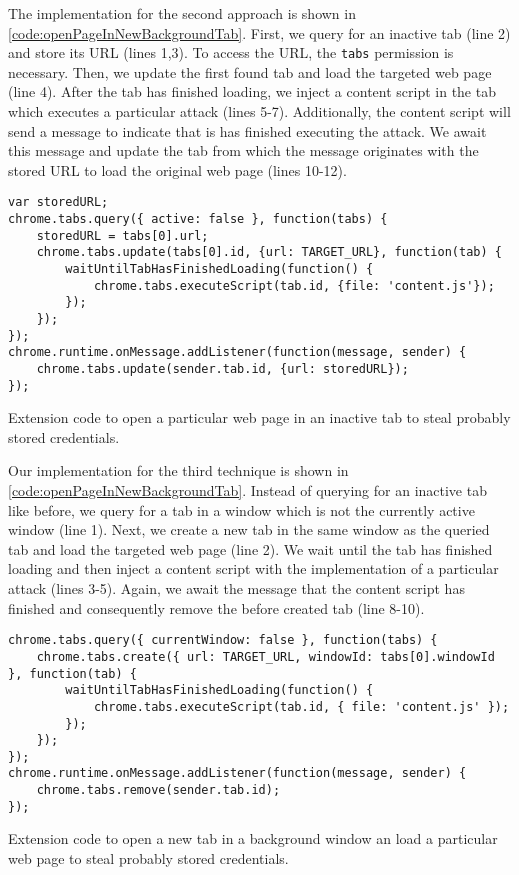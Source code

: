 	The implementation for the second approach is shown in \autoref{code:openPageInNewBackgroundTab}. First, we query for an inactive tab (line 2) and store its URL (lines 1,3). To access the URL, the \texttt{tabs} permission is necessary. Then, we update the first found tab and load the targeted web page (line 4). After the tab has finished loading, we inject a content script in the tab which executes a particular attack (lines 5-7). Additionally, the content script will send a message to indicate that is has finished executing the attack. We await this message and update the tab from which the message originates with the stored URL to load the original web page (lines 10-12).
		
	\begin{code}
		\begin{lstlisting}
var storedURL;
chrome.tabs.query({ active: false }, function(tabs) {	
	storedURL = tabs[0].url;
	chrome.tabs.update(tabs[0].id, {url: TARGET_URL}, function(tab) {
		waitUntilTabHasFinishedLoading(function() {
			chrome.tabs.executeScript(tab.id, {file: 'content.js'});	
		});
	});
});
chrome.runtime.onMessage.addListener(function(message, sender) {
	chrome.tabs.update(sender.tab.id, {url: storedURL});
});
\end{lstlisting}
		\caption{Extension code to open a particular web page in an inactive tab to steal probably stored credentials.}
		\label{code:openPageInInactiveTab}
	\end{code}
	
	Our implementation for the third technique is shown in \autoref{code:openPageInNewBackgroundTab}. Instead of querying for an inactive tab like before, we query for a tab in a window which is not the currently active window (line 1). Next, we create a new tab in the same window as the queried tab and load the targeted web page (line 2). We wait until the tab has finished loading and then inject a content script with the implementation of a particular attack (lines 3-5). Again, we await the message that the content script has finished and consequently remove the before created tab (line 8-10).

	\begin{code}
		\begin{lstlisting}
chrome.tabs.query({ currentWindow: false }, function(tabs) {	
	chrome.tabs.create({ url: TARGET_URL, windowId: tabs[0].windowId },	function(tab) {
		waitUntilTabHasFinishedLoading(function() {
			chrome.tabs.executeScript(tab.id, { file: 'content.js' });	
		});
	});
});
chrome.runtime.onMessage.addListener(function(message, sender) {
	chrome.tabs.remove(sender.tab.id);
});
\end{lstlisting}
		\caption{Extension code to open a new tab in a background window an load a particular web page to steal probably stored credentials.}
		\label{code:openPageInNewBackgroundTab}
	\end{code}
			
